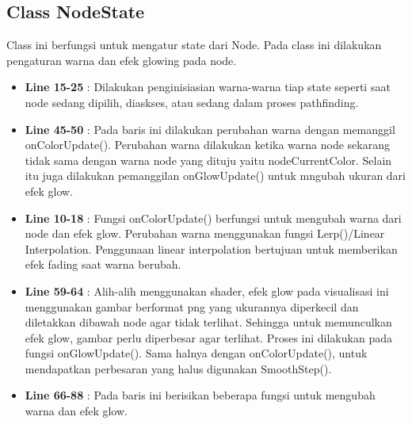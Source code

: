 \documentclass[12pt,a4paper,oneside]{article}
\begin{document}
\subsection{Class NodeState}
Class ini berfungsi untuk mengatur state dari Node. Pada class ini dilakukan pengaturan warna dan efek glowing pada node.
\begin{itemize}
	\item \textbf{Line 15-25} : Dilakukan penginisiasian warna-warna tiap state seperti saat node sedang dipilih, diaskses, atau sedang dalam proses pathfinding.
	\item \textbf{Line 45-50} : Pada baris ini dilakukan perubahan warna dengan memanggil onColorUpdate(). Perubahan warna dilakukan ketika warna node sekarang tidak sama dengan warna node yang dituju yaitu nodeCurrentColor. Selain itu juga dilakukan pemanggilan onGlowUpdate() untuk mngubah ukuran dari efek glow.
	\item \textbf{Line 10-18} : Fungsi onColorUpdate() berfungsi untuk mengubah warna dari node dan efek glow. Perubahan warna menggunakan fungsi Lerp()/Linear Interpolation. Penggunaan linear interpolation bertujuan untuk memberikan efek fading saat warna berubah.
	\item \textbf{Line 59-64} : Alih-alih menggunakan shader, efek glow pada visualisasi ini menggunakan gambar berformat png yang ukurannya diperkecil dan diletakkan dibawah node agar tidak terlihat. Sehingga untuk memunculkan efek glow, gambar perlu diperbesar agar terlihat. Proses ini dilakukan pada fungsi onGlowUpdate(). Sama halnya dengan onColorUpdate(), untuk mendapatkan perbesaran yang halus digunakan SmoothStep().
	\item \textbf{Line 66-88} : Pada baris ini berisikan beberapa fungsi untuk mengubah warna dan efek glow. 
\end{itemize}
\end{document}
